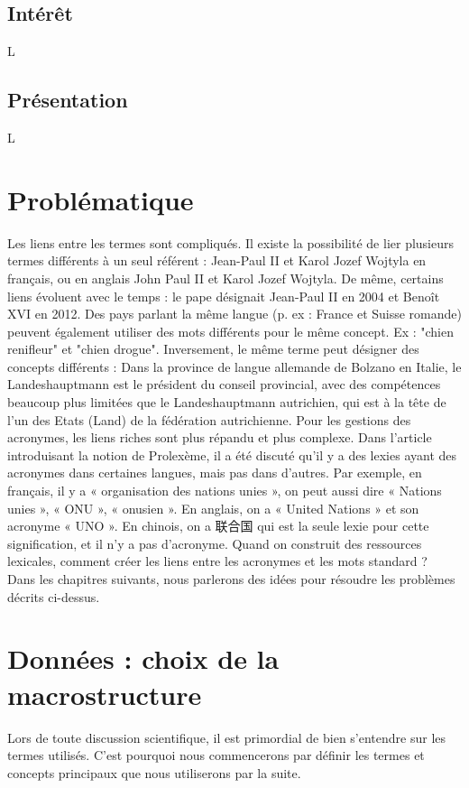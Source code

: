 \documentclass[10pt,a4paper,twoside]{article}
\begin{document}
\subsection{Intérêt}

L

\subsection{Présentation}

L

\section{Problématique}

Les liens entre les termes sont compliqués. Il existe la possibilité de lier plusieurs termes différents à un seul référent : Jean-Paul II et Karol Jozef Wojtyla en français, ou en anglais John Paul II et Karol Jozef Wojtyla. De même, certains liens évoluent avec le temps : le pape désignait Jean-Paul II en 2004 et Benoît XVI en 2012. Des pays parlant la même langue (p. ex : France et Suisse romande) peuvent également utiliser des mots différents pour le même concept. Ex : "chien renifleur" et "chien drogue". Inversement, le même terme peut désigner des concepts différents : Dans la province de langue allemande de Bolzano en Italie, le Landeshauptmann est le président du conseil provincial, avec des compétences beaucoup plus limitées que le Landeshauptmann autrichien, qui est à la tête de l'un des Etats (Land) de la fédération autrichienne.
Pour les gestions des acronymes, les liens riches sont plus répandu et plus complexe. Dans l'article introduisant la notion de Prolexème, il a été discuté qu’il y a des lexies ayant des acronymes dans certaines langues, mais pas dans d'autres. Par exemple, en français, il y a « organisation des nations unies », on peut aussi dire « Nations unies », « ONU », « onusien ». En anglais, on a « United Nations » et son acronyme « UNO ». En chinois, on a 联合国 qui est la seule lexie pour cette signification, et il n’y a pas d’acronyme. Quand on construit des ressources lexicales, comment créer les liens entre les acronymes et les mots standard ?\\
Dans les chapitres suivants, nous parlerons des idées pour résoudre les problèmes décrits ci-dessus. 

\section{Données : choix de la macrostructure}
Lors de toute discussion scientifique, il est primordial de bien s'entendre sur les termes utilisés. C'est pourquoi nous commencerons par définir les termes et concepts principaux que nous utiliserons par la suite.
\end{document}
